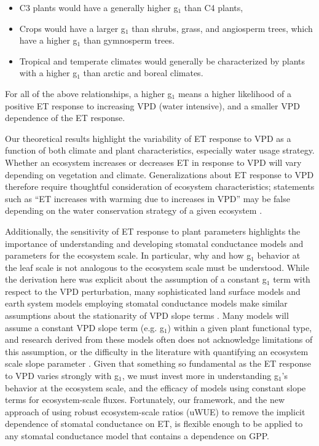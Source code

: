 \documentclass[draft]{agujournal2019}
\begin{document}
\begin{itemize}
  \item C3 plants would have a generally higher g$_1$ than C4 plants,
  \item Crops would have a larger g$_1$ than shrubs, grass, and
    angiosperm trees, which have a higher g$_1$ than gymnosperm
    trees.
  \item Tropical and temperate climates would generally be
    characterized by plants with a higher g$_1$ than arctic and boreal
    climates.
\end{itemize}
For all of the above relationships, a higher g$_1$ means a higher
likelihood of a positive ET response to increasing VPD (water
intensive), and a smaller VPD dependence of the ET response.

Our theoretical results highlight the variability of ET
response to VPD as a function of both climate  and plant
characteristics, especially water usage strategy. Whether an
ecosystem increases or decreases ET in response to VPD will vary
depending on vegetation and climate. Generalizations about ET response
to VPD therefore require thoughtful consideration of ecosystem
characteristics; statements such as ``ET increases with warming due to
increases in VPD'' may be false depending on the water conservation
strategy of a given ecosystem \cite{Lemordant_2018}.

Additionally, the sensitivity of ET response to plant parameters
highlights the importance of understanding and developing stomatal
conductance models and parameters for the ecosystem scale. In
particular, why and how g$_1$ behavior at the leaf scale is not
analogous to the ecosystem scale must be understood. While the
derivation here was explicit about the assumption of a constant g$_1$
term with respect to the VPD perturbation, many sophisticated land
surface models and earth system models employing stomatal conductance
models make similar assumptions about the stationarity of VPD slope
terms \cite{Niu_2011, Franks_2017, Rogers_2017, Lawrence_2019}. Many
models will assume a constant VPD slope term (e.g. g$_1$) within
a given plant functional type, and research derived from these models
often does not acknowledge limitations of this assumption, or the
difficulty in the literature with quantifying an ecosystem scale slope
parameter \cite{Medlyn_2017}. Given that something so fundamental as
the ET response to VPD varies strongly with g$_1$, we must invest more
in understanding g$_1$'s behavior at the ecosystem scale, and the
efficacy of models using constant slope terms for ecosystem-scale
fluxes. Fortunately, our framework, and the new approach of using
robust ecosystem-scale ratios (uWUE) to remove the implicit dependence
of stomatal conductance on ET, is flexible enough to be applied to any
stomatal conductance model that contains a dependence on GPP.
\end{document}
